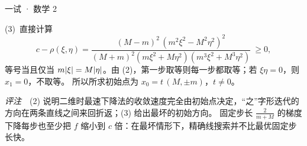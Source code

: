 \documentclass[cjk=noto, seal=first]{mojing-exam}
\begin{document}
\begin{paper}[time={建议 3 小时（训练设置）}, full=150]{一试 · 数学 2}
\begin{questions}
\begin{solution}
(3)~直接计算
\[
  c-\rho(\xi,\eta)=\frac{(M-m)^2\,(m^2\xi^2-M^2\eta^2)^2}{(M+m)^2(m\xi^2+M\eta^2)(m^3\xi^2+M^3\eta^2)}\ \ge0,
\]
等号当且仅当 $m\lvert\xi\rvert=M\lvert\eta\rvert$。由 (2)，第一步取等则每一步都取等；若 $\xi\eta=0$，则 $x_1=0$，不取等。
所以所求初始点为 $x_0=t\,(M,\pm m)$，$t\ne0$。

\emph{评注}　(2) 说明二维时最速下降法的收敛速度完全由初始点决定，“之”字形迭代的方向在两条直线之间来回折返；(3) 给出最坏的初始方向。
固定步长 $\frac2{m+M}$ 的梯度下降每步也至少把 $f$ 缩小到 $c$ 倍：在最坏情形下，精确线搜索并不比最优固定步长快。
\end{solution}

\end{questions}
\end{paper}
\end{document}

